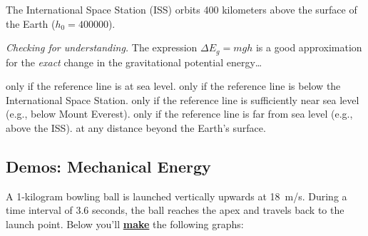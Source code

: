 \documentclass[]{exam}
\begin{document}
\begin{questions}
\question
The International Space Station (ISS) orbits 400 kilometers above the surface of the Earth ($h_0 = \num{400000}$).


\question \textit{Checking for understanding.} The expression $\Delta E_g = mgh$ is a good approximation for the \textit{exact} change in the gravitational potential energy\ldots

\begin{randomizechoices}[norandomize]
    \choice only if the reference line is at sea level.
    \choice only if the reference line is below the International Space Station. 
    \correctchoice only if the reference line is sufficiently near sea level (e.g., below Mount Everest).
    \choice only if the reference line is far from sea level (e.g., above the ISS).
    \choice at any distance beyond the Earth's surface.
\end{randomizechoices}


\clearpage



\subsection*{Demos: Mechanical Energy}

\begin{questions}
\question
A 1-kilogram bowling ball is launched vertically upwards at \SI{18}{m/s}. During a time interval of 3.6 seconds, the ball reaches the apex and travels back to the launch point. Below you'll \textbf{\underline{make}} the following graphs:


\end{questions}
\end{questions}
\end{document}
